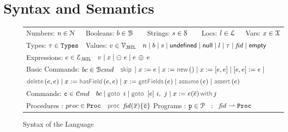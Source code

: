


\newtheorem{lemmax}{}
\newtheorem{temax}{}
\newtheorem{cormax}{}

\section{\jsil Syntax and Semantics}

\vspace*{-0.2cm}
\begin{figure}[!ht]
\begin{minipage}{\textwidth}
\begin{tabular}{lllll}
	 Numbers: $n \in \mathcal{N}$ &  Booleans: $b \in \mathcal{B}$ & \  \ Strings: $s \in {\mathcal S}$ & \  \ Locs: $l \in {\mathcal L}$ & \  Vars: $x \in \mathcal{X}$ \\[0.1cm]
	Types: $\tau \in \mathtt{Types}$ & \multicolumn{4}{l}{Values: $v \in \mathcal{V}_{\mathtt{JSIL}}$  \ $n \mid b \mid s \mid  {{\sf undefined}} \mid {\sf null} \mid l \mid \tau \mid \mathit{fid} \mid {\sf empty}$} \\[0.1cm]
\multicolumn{5}{l}{Expressions: $e \in \mathcal{E}_{\mathtt{JSIL}}$  \ $v \mid x \mid \ominus\ e \mid e \, \oplus_{} \, e $} \\[0.1cm]
	\multicolumn{5}{l}{Basic Commands: $bc \in \mathcal{B}cmd$ \ $\jsilskip \mid \jvar := \jsilexpr  \mid \jvar := \jsilnew() \mid \jvar := [\jsilexpr, \jsilexpr] \mid [\jsilexpr, \jsilexpr] := \jsilexpr \mid$} \\[0.1cm]
	\multicolumn{5}{l}{\hspace{2.8cm} $\jsildelete(\jsilexpr, \jsilexpr) \mid \jvar := \hasfield(\jsilexpr, \jsilexpr) \mid \jvar := \getfields(\jsilexpr) \mid \assume(\jsilexpr) \mid \assert(\jsilexpr)$} \\[0.1cm]
	\multicolumn{5}{l}{Commands: $\mathtt{c} \in \mathcal{C}md$  \ $ \bcmd \mid \goto \ i \mid  \ifgoto{\jsilexpr}{i}{j} \mid \jsilcall{\jvar}{\jsilexpr}{\jvec{\jsilexpr}}{j}$} \\[0.1cm]
	\multicolumn{5}{l}{Procedures : $proc \in \mathtt{Proc}$  \ $\procedure{\fid}{\jvec{\jvar}}{\jvec{\ivlcmd}}$ \qquad Programs : $\mathtt{p} \in \mathcal{P}$ \ : \ $\mathit{fid} \rightharpoonup \mathtt{Proc}$}
 \end{tabular}
 \vspace*{-0.2cm}
 \caption{Syntax of the \jsil Language}
 \label{def:jsil-types}
 \end{minipage}
  \vspace*{-0.5cm}
 \end{figure}

